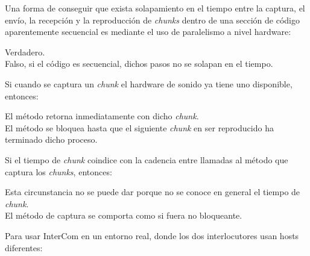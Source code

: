 \documentclass[legalpaper, 12pt, addpoints]{exam}
\begin{document}
\begin{questions}
\vspace{0.10in}

\question Una forma de conseguir que exista solapamiento en el tiempo
entre la captura, el envío, la recepción y la reproducción de
\emph{chunks} dentro de una sección de código aparentemente secuencial
es mediante el uso de paralelismo a nivel hardware:

\begin{oneparchoices}
  \choice Verdadero.\\
  \choice Falso, si el código es secuencial, dichos pasos no se solapan en el tiempo.
\end{oneparchoices}
  
\vspace{0.10in}

\question Si cuando se captura un \emph{chunk} el hardware de sonido
ya tiene uno disponible, entonces:

\begin{oneparchoices}
  \choice El método retorna inmediatamente con dicho \emph{chunk}.\\
  \choice El método se bloquea hasta que el siguiente \emph{chunk} en ser reproducido ha terminado dicho proceso.
\end{oneparchoices}
  
\vspace{0.10in}

\question Si el tiempo de \emph{chunk} coindice con la cadencia entre
llamadas al método que captura los \emph{chunks}, entonces:

\begin{oneparchoices}
  \choice Esta circunstancia no se puede dar porque no se conoce en general el tiempo de \emph{chunk}.\\
  \choice El método de captura se comporta como si fuera no bloqueante.
\end{oneparchoices}
  
\vspace{0.10in}

\question Para usar InterCom en un entorno real, donde los dos interlocutores usan hosts diferentes:

  

\end{questions}
\end{document}
